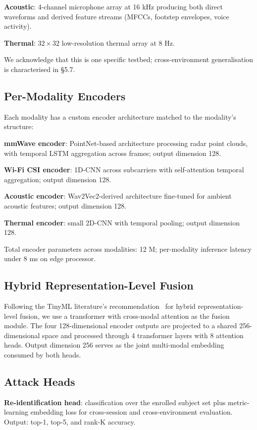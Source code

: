\documentclass[sigconf,nonacm]{acmart}
\begin{document}
\textbf{Acoustic}: 4-channel microphone array at 16 kHz
producing both direct waveforms and derived feature streams
(MFCCs, footstep envelopes, voice activity).

\textbf{Thermal}: $32 \times 32$ low-resolution thermal array at
8 Hz.

We acknowledge that this is one specific testbed; cross-environment
generalisation is characterised in §5.7.

\subsection{Per-Modality Encoders}

Each modality has a custom encoder architecture matched to the
modality's structure:

\textbf{mmWave encoder}: PointNet-based architecture processing
radar point clouds, with temporal LSTM aggregation across frames;
output dimension 128.

\textbf{Wi-Fi CSI encoder}: 1D-CNN across subcarriers with
self-attention temporal aggregation; output dimension 128.

\textbf{Acoustic encoder}: Wav2Vec2-derived architecture
fine-tuned for ambient acoustic features; output dimension 128.

\textbf{Thermal encoder}: small 2D-CNN with temporal pooling;
output dimension 128.

Total encoder parameters across modalities: 12 M; per-modality
inference latency under 8 ms on edge processor.

\subsection{Hybrid Representation-Level Fusion}

Following the TinyML literature's
recommendation~\cite{george2025tinyml} for hybrid representation-level
fusion, we use a transformer with cross-modal attention as the
fusion module. The four 128-dimensional encoder outputs are
projected to a shared 256-dimensional space and processed through
4 transformer layers with 8 attention heads. Output dimension 256
serves as the joint multi-modal embedding consumed by both heads.

\subsection{Attack Heads}

\textbf{Re-identification head}: classification over the enrolled
subject set plus metric-learning embedding loss for
cross-session and cross-environment evaluation. Output: top-1,
top-5, and rank-K accuracy.
\end{document}
